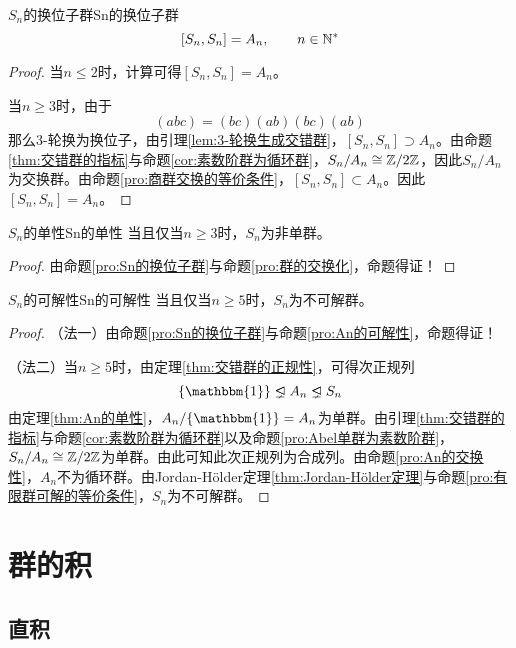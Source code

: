 \begin{proposition}{$S_n$的换位子群}{Sn的换位子群}
	$$
	[S_n,S_n]=A_n,\qquad n\in\mathbb{N}^*
	$$
\end{proposition}

\begin{proof}
	当$n\le 2$时，计算可得$[S_n,S_n]=A_n$。
	
	当$n\ge 3$时，由于
	$$
	(abc)=(bc)(ab)(bc)(ab)
	$$
	那么$3$-轮换为换位子，由引理\ref{lem:3-轮换生成交错群}，$[S_n,S_n]\supset A_n$。由命题\ref{thm:交错群的指标}与命题\ref{cor:素数阶群为循环群}，$S_n/A_n\cong\mathbb{Z}/2\mathbb{Z}$，因此$S_n/A_n$为交换群。由命题\ref{pro:商群交换的等价条件}，$[S_n,S_n]\subset A_n$。因此$[S_n,S_n]=A_n$。
\end{proof}

\begin{proposition}{$S_n$的单性}{Sn的单性}
	当且仅当$n\ge 3$时，$S_n$为非单群。
\end{proposition}

\begin{proof}
	由命题\ref{pro:Sn的换位子群}与命题\ref{pro:群的交换化}，命题得证！
\end{proof}

\begin{theorem}{$S_n$的可解性}{Sn的可解性}
	当且仅当$n\ge 5$时，$S_n$为不可解群。
\end{theorem}

\begin{proof}
	（法一）由命题\ref{pro:Sn的换位子群}与命题\ref{pro:An的可解性}，命题得证！
	
	（法二）当$n\ge 5$时，由定理\ref{thm:交错群的正规性}，可得次正规列
	$$
	\{\mathbbm{1}\}\lhdneq A_n \lhdneq S_n
	$$
	由定理\ref{thm:An的单性}，$A_n/\{\mathbbm{1}\}=A_n$为单群。由引理\ref{thm:交错群的指标}与命题\ref{cor:素数阶群为循环群}以及命题\ref{pro:Abel单群为素数阶群}，$S_n/A_n\cong \mathbb{Z}/2\mathbb{Z}$为单群。由此可知此次正规列为合成列。由命题\ref{pro:An的交换性}，$A_n$不为循环群。由Jordan-Hölder定理\ref{thm:Jordan-Hölder定理}与命题\ref{pro:有限群可解的等价条件}，$S_n$为不可解群。
\end{proof}

\section{群的积}

\subsection{直积}

